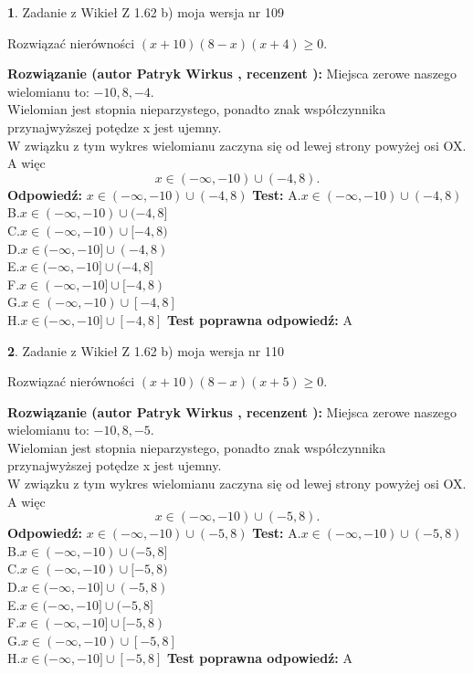 \documentclass[12pt, a4paper]{article}
\theoremstyle{definition} %
\newtheorem{zad}{}
\newcommand{\zadStart}[1]{\begin{zad}#1\newline}
\newcommand{\zadStop}{\end{zad}}
\newcommand{\rozwStart}[2]{\noindent \textbf{Rozwiązanie (autor #1 , recenzent #2): }\newline}
\newcommand{\rozwStop}{\newline}
\newcommand{\odpStart}{\noindent \textbf{Odpowiedź:}\newline}
\newcommand{\odpStop}{\newline}
\newcommand{\testStart}{\noindent \textbf{Test:}\newline}
\newcommand{\testStop}{\newline}
\newcommand{\kluczStart}{\noindent \textbf{Test poprawna odpowiedź:}\newline}
\newcommand{\kluczStop}{\newline}
\begin{document}
\zadStart{Zadanie z Wikieł Z 1.62 b) moja wersja nr 109}

Rozwiązać nierówności $(x+10)(8-x)(x+4)\ge0$.
\zadStop
\rozwStart{Patryk Wirkus}{}
Miejsca zerowe naszego wielomianu to: $-10, 8, -4$.\\
Wielomian jest stopnia nieparzystego, ponadto znak współczynnika przy\linebreak najwyższej potędze x jest ujemny.\\ W związku z tym wykres wielomianu zaczyna się od lewej strony powyżej osi OX. A więc $$x \in (-\infty,-10) \cup (-4,8).$$
\rozwStop
\odpStart
$x \in (-\infty,-10) \cup (-4,8)$
\odpStop
\testStart
A.$x \in (-\infty,-10) \cup (-4,8)$\\
B.$x \in (-\infty,-10) \cup (-4,8]$\\
C.$x \in (-\infty,-10) \cup [-4,8)$\\
D.$x \in (-\infty,-10] \cup (-4,8)$\\
E.$x \in (-\infty,-10] \cup (-4,8]$\\
F.$x \in (-\infty,-10] \cup [-4,8)$\\
G.$x \in (-\infty,-10) \cup [-4,8]$\\
H.$x \in (-\infty,-10] \cup [-4,8]$
\testStop
\kluczStart
A
\kluczStop



\zadStart{Zadanie z Wikieł Z 1.62 b) moja wersja nr 110}

Rozwiązać nierówności $(x+10)(8-x)(x+5)\ge0$.
\zadStop
\rozwStart{Patryk Wirkus}{}
Miejsca zerowe naszego wielomianu to: $-10, 8, -5$.\\
Wielomian jest stopnia nieparzystego, ponadto znak współczynnika przy\linebreak najwyższej potędze x jest ujemny.\\ W związku z tym wykres wielomianu zaczyna się od lewej strony powyżej osi OX. A więc $$x \in (-\infty,-10) \cup (-5,8).$$
\rozwStop
\odpStart
$x \in (-\infty,-10) \cup (-5,8)$
\odpStop
\testStart
A.$x \in (-\infty,-10) \cup (-5,8)$\\
B.$x \in (-\infty,-10) \cup (-5,8]$\\
C.$x \in (-\infty,-10) \cup [-5,8)$\\
D.$x \in (-\infty,-10] \cup (-5,8)$\\
E.$x \in (-\infty,-10] \cup (-5,8]$\\
F.$x \in (-\infty,-10] \cup [-5,8)$\\
G.$x \in (-\infty,-10) \cup [-5,8]$\\
H.$x \in (-\infty,-10] \cup [-5,8]$
\testStop
\kluczStart
A
\kluczStop
\end{document}
